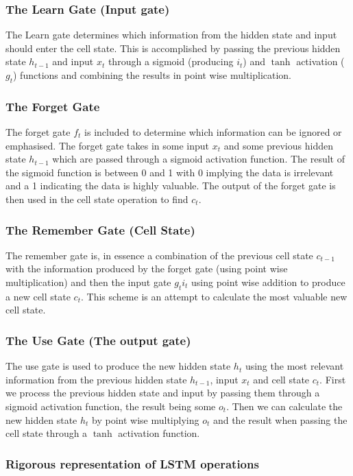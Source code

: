 \documentclass{article}
\begin{document}
\subsubsection{The Learn Gate (Input gate)} 
The Learn gate determines which information from the hidden state and input should enter the cell state. This is accomplished by passing the previous hidden state $h_{t-1}$ and input $x_t$ through a sigmoid (producing $i_t$) and $\tanh$ activation ($g_t$) functions and combining the results in point wise multiplication.
\subsubsection{The Forget Gate} 
The forget gate $f_t$ is included to determine which information can be ignored or emphasised. The forget gate takes in some input $x_t$ and some previous hidden state $h_{t-1}$ which are passed through a sigmoid activation function. The result of the sigmoid function is between 0 and 1 with 0 implying the data is irrelevant and a 1 indicating the data is highly valuable. The output of the forget gate is then used in the cell state operation to find $c_t$.
\subsubsection{The Remember Gate (Cell State)} 
The remember gate is, in essence a combination of the previous cell state $c_{t-1}$ with the information produced by the forget gate (using point wise multiplication) and then the input gate $g_t i_t$ using point wise addition to produce a new cell state $c_t$. This scheme is an attempt to calculate the most valuable new cell state.
\subsubsection{The Use Gate (The output gate) } 
The use gate is used to produce the new hidden state $h_t$ using the most relevant information from the previous hidden state $h_{t-1}$, input $x_t$ and cell state $c_t$. First we process the previous hidden state and input by passing them through a sigmoid activation function, the result being some $o_t$. Then we can calculate the new hidden state $h_t$ by point wise multiplying $o_t$ and the result when passing the cell state through a $\tanh$ activation function.

\subsubsection{Rigorous representation of LSTM operations} 
\end{document}
